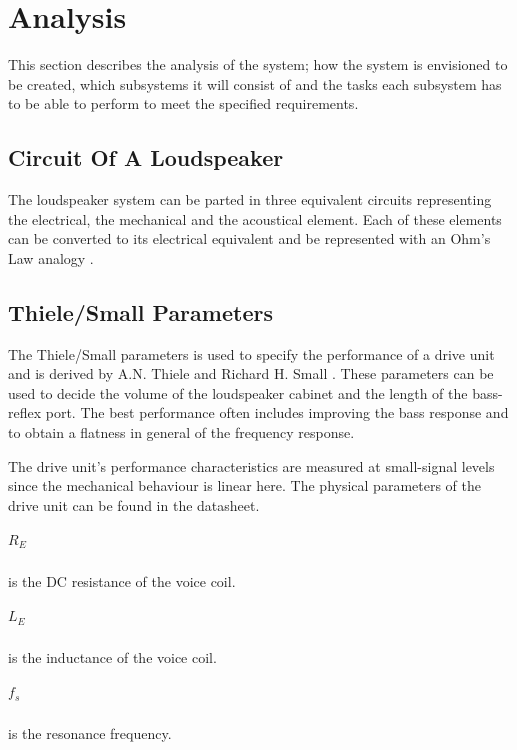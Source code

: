 
\chapter{Analysis}

This section describes the analysis of the system; how the system is envisioned to be created, which subsystems it will consist of and the tasks each subsystem has to be able to perform to meet the specified requirements.

\section{Circuit Of A Loudspeaker}
The loudspeaker system can be parted in three equivalent circuits representing the electrical, the mechanical and the acoustical element. Each of these elements can be converted to its electrical equivalent and be represented with an Ohm's Law analogy \cite[p.~115]{Elektroakustik}.


\section{Thiele/Small Parameters}
The Thiele/Small parameters is used to specify the performance of a drive unit and is derived by A.N. Thiele \cite{thiele1971loudspeakers} and Richard H. Small \cite{small1972closed}.
These parameters can be used to decide the volume of the loudspeaker cabinet and the length of the bass-reflex port. The best performance often includes improving the bass response and to obtain a flatness in general of the frequency response.

The drive unit's performance characteristics are measured at small-signal levels since the mechanical behaviour is linear here.  
The physical parameters of the drive unit can be found in the datasheet.


\paragraph{$R_E$} is the DC resistance of the voice coil.

\paragraph{$L_E$} is the inductance of the voice coil.

\paragraph{$f_s$} is the resonance frequency.

